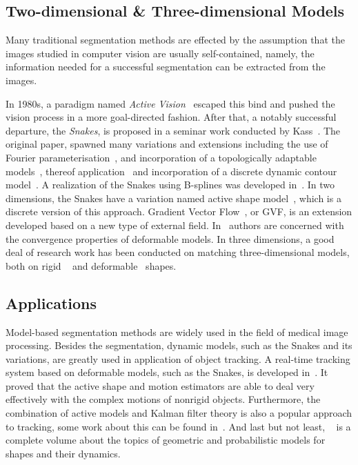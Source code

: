 \documentclass[conference]{IEEEtran}
\begin{document}
\subsection{Two-dimensional \& Three-dimensional Models}
\label{sec:23m}
Many traditional segmentation methods are effected by the assumption that the
images studied in computer vision are usually self-contained, namely,
the information needed for a successful segmentation can be extracted
from the images.

In 1980s, a paradigm named \textit{Active Vision}~\cite{aloimonos1988active} escaped this bind and
pushed the vision process in a more goal-directed fashion. After that, a
notably successful departure, the \textit{Snakes}, is proposed in a
seminar work conducted by Kass~\cite{kass1988snakes}. The original paper, spawned many variations
and extensions including the use of Fourier
parameterisation~\cite{scott1987alternative}, and incorporation
of a topologically adaptable models~\cite{mcinerney1995topologically},
thereof application~\cite{mcinemey1999topology} and incorporation of a discrete
dynamic contour model~\cite{lobregt1995discrete}. A realization of the
Snakes using B-splines was developed in~\cite{brigger2000b}. In two
dimensions, the Snakes have a variation named active shape
model~\cite{cootes1995active}, which is a discrete version of this
approach. Gradient Vector Flow~\cite{xu1998snakes}, or GVF, is an extension developed
based on a new type of external field. In~\cite{xu2000gradient}
authors are concerned with the convergence properties of deformable
models. In three dimensions, a good deal of research work has been
conducted on matching three-dimensional models, both on rigid
~\cite{harris1993tracking} and deformable~\cite{terzopoulos1991dynamic} shapes.
\subsection{Applications}
\label{sec:app}
Model-based segmentation methods are widely used in the field of
medical image processing. Besides the segmentation,
dynamic models, such as the Snakes and its variations, are greatly used in application of object
tracking. A real-time tracking system based on deformable models, such
as the Snakes, is developed
in~\cite{terzopoulos1992tracking}. It proved that the active shape and
motion estimators are able to deal very effectively with the complex
motions of nonrigid objects. Furthermore, the combination of active
models and Kalman filter theory is also a popular approach to
tracking, some work about this can be found
in~\cite{schick1991simultaneous}. And last but not least,
~\cite{blake1998active} is a complete volume about the topics of
geometric and probabilistic models  for shapes and their dynamics.
\end{document}
